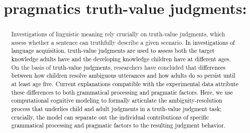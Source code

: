 \documentclass[cm]{glossa}
\title[When pragmatics matters more for truth-value judgments]{\lp{When} pragmatics \lp{matters more 
for} truth-value judgments: 
\lp{
An investigation of quantifier scope ambiguity}}
\newcommand{\lsp}[1]{\textcolor{red}{[lsp: #1]}}
\newcommand{\lp}[1]{\textcolor{black}{#1}} %
\begin{document}
\sffamily
\maketitle


\begin{abstract}
Investigations of linguistic meaning rely crucially on truth-value judgments, which assess whether a sentence can truthfully describe a given scenario. \lp{In investigations of language acquisition, truth-value judgments are used to assess both the target knowledge adults have and the developing knowledge children have at different ages.} On the basis of \lp{truth-value judgments}, researchers have concluded that
\lp{differences between how children resolve ambiguous utterances and how adults do so persist until at least age five.}
\lp{Current explanations compatible with the experimental data attribute these differences to both grammatical processing and pragmatic factors.}
\lp{Here, we use computational cognitive modeling to formally articulate the ambiguity-resolution process that underlies child and adult judgments in a truth-value judgment task; crucially, the model can separate out the individual contributions of specific grammatical processing and pragmatic factors to the resulting judgment behavior.}

\end{abstract}
\end{document}
